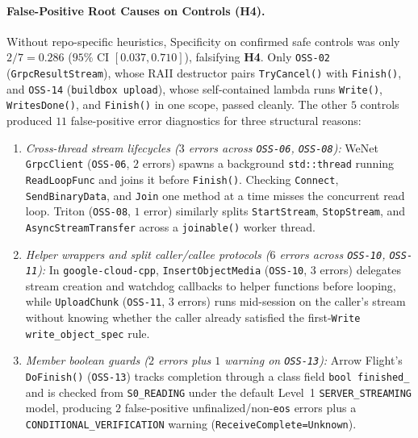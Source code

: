 \paragraph{False-Positive Root Causes on Controls (\textbf{H4}).}
Without repo-specific heuristics, Specificity on confirmed safe controls was only $2/7 = 0.286$ ($95\%$ CI $[0.037, 0.710]$), falsifying \textbf{H4}. Only \texttt{OSS-02} (\texttt{GrpcResultStream}), whose RAII destructor pairs \texttt{TryCancel()} with \texttt{Finish()}, and \texttt{OSS-14} (\texttt{buildbox upload}), whose self-contained lambda runs \texttt{Write()}, \texttt{WritesDone()}, and \texttt{Finish()} in one scope, passed cleanly. The other $5$ controls produced $11$ false-positive error diagnostics for three structural reasons:
\begin{enumerate}
    \item \emph{Cross-thread stream lifecycles ($3$ errors across \texttt{OSS-06}, \texttt{OSS-08}):} WeNet \texttt{GrpcClient} (\texttt{OSS-06}, $2$ errors) spawns a background \texttt{std::thread} running \texttt{ReadLoopFunc} and joins it before \texttt{Finish()}. Checking \texttt{Connect}, \texttt{SendBinaryData}, and \texttt{Join} one method at a time misses the concurrent read loop. Triton (\texttt{OSS-08}, $1$ error) similarly splits \texttt{StartStream}, \texttt{StopStream}, and \texttt{AsyncStreamTransfer} across a \texttt{joinable()} worker thread.
    \item \emph{Helper wrappers and split caller/callee protocols ($6$ errors across \texttt{OSS-10}, \texttt{OSS-11}):} In \texttt{google-\allowbreak cloud-\allowbreak cpp}, \texttt{InsertObjectMedia} (\texttt{OSS-10}, $3$ errors) delegates stream creation and watchdog callbacks to helper functions before looping, while \texttt{UploadChunk} (\texttt{OSS-11}, $3$ errors) runs mid-session on the caller's stream without knowing whether the caller already satisfied the first-\texttt{Write} \texttt{write\_\allowbreak object\_\allowbreak spec} rule.
    \item \emph{Member boolean guards ($2$ errors plus $1$ warning on \texttt{OSS-13}):} Arrow Flight's \texttt{DoFinish()} (\texttt{OSS-13}) tracks completion through a class field \texttt{bool finished\_} and is checked from \texttt{S0\_\allowbreak READING} under the default Level~1 \texttt{SERVER\_\allowbreak STREAMING} model, producing $2$ false-positive unfinalized/non-\texttt{eos} errors plus a \texttt{CONDITIONAL\_\allowbreak VERIFICATION} warning (\texttt{Receive\allowbreak Complete=\allowbreak Unknown}).
\end{enumerate}

